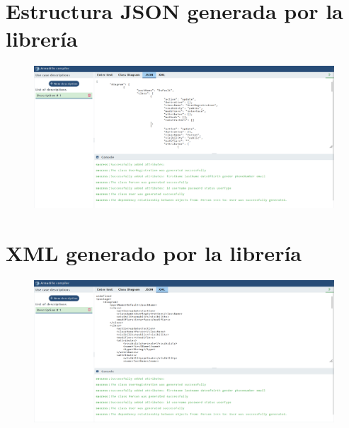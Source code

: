 \section{Estructura JSON generada por la librería}
\begin{figure}[H]
	\centering
	\includegraphics[width=15cm]{img/anexo5.png}
	\label{fig:anexo5}
\end{figure} 

\section{XML generado por la librería}
\begin{figure}[H]
	\centering
	\includegraphics[width=15cm]{img/anexo6.png}
	\label{fig:anexo6}
\end{figure} 

